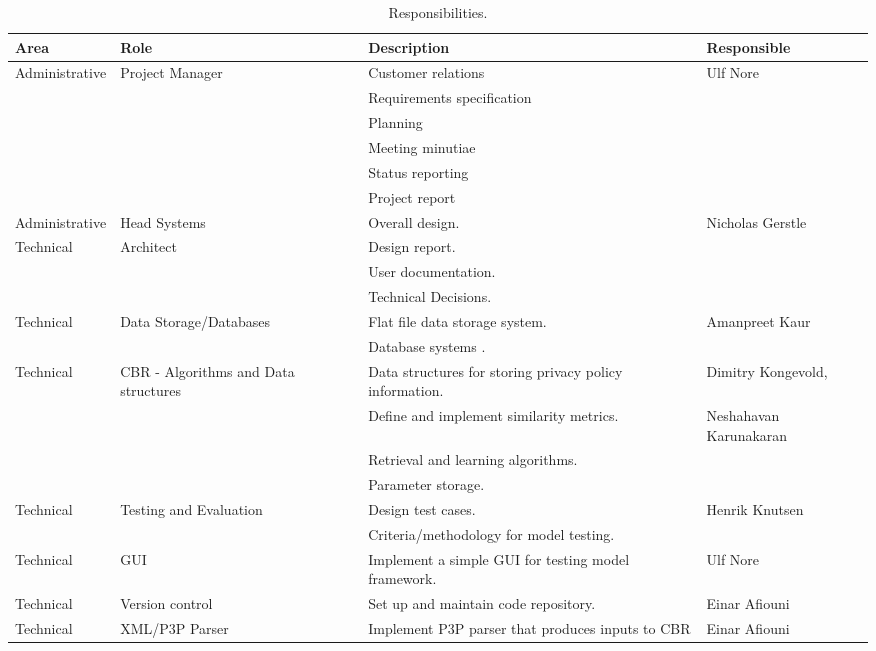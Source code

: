 \begin{table}[htdp]
\begin{center}
\begin{tabularx}{\textwidth}{| X | X | X | X |}
\hline
\textbf{Area} & \textbf{Role} & \textbf{Description} &\textbf{Responsible} \\
\hline
Administrative 		&Project Manager 	&  Customer relations & Ulf Nore \\
				&			 	& Requirements specification & \\
				&				& Planning 			      & \\
				&				& Meeting minutiae 		      & \\
				&				& Status reporting		      & \\
				&				& Project report 		      & \\	
\hline
Administrative 	& Head Systems  & Overall design.	 	& Nicholas Gerstle \\
Technical 		& Architect 	   & Design report.		& \\
			&			   & User documentation.	& \\
			&			   & Technical Decisions.	& \\
\hline
\hline
Technical &	Data Storage/Databases  & Flat file data storage system. & Amanpreet Kaur \\
		&						& Database systems	.		& \\
\hline
Technical & CBR - Algorithms and Data structures 	& Data structures for storing privacy policy information.	& Dimitry Kongevold,\\
 		&								& Define and implement similarity metrics.			& Neshahavan Karunakaran \\
 		&								& Retrieval and learning algorithms. 				&	\\
		&								& Parameter storage. 							& \\
\hline
Technical 	&	Testing and Evaluation 	& Design test cases. 	& Henrik Knutsen \\
		&						& Criteria/methodology for model testing. & \\
\hline
Technical & GUI & Implement a simple GUI for testing model framework. & Ulf Nore \\
\hline
Technical & Version control & Set up and maintain code repository. & Einar Afiouni \\
\hline
Technical & XML/P3P Parser & Implement P3P parser that produces inputs to CBR & Einar Afiouni \\
\hline
\end{tabularx}
\caption{Responsibilities.}
\end{center}
\label{orgTable}
\end{table}%



